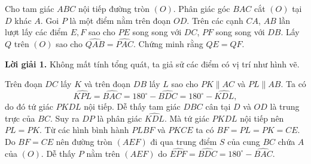 \begin{bt}%
	Cho tam giác $ABC$ nội tiếp đường tròn $(O)$. Phân giác góc $BAC$ cắt $(O)$ tại $D$ khác $A$. Goi $P$ là một điểm nằm trên đoạn $OD$. Trên các cạnh $CA$, $AB$ lần lượt lấy các điểm $E,F$ sao cho $PE$ song song với $DC$, $PF$ song song với $DB$. Lấy $Q$ trên $(O)$ sao cho $\widehat{QAB} = \widehat{PAC}$. Chứng minh rằng $QE = QF$.
	\loigiai
	{{\bf Lời giải 1.} Không mất tính tổng quát, ta giả sử các điểm có vị trí như hình vẽ.
		\begin{center}
		\end{center}
		Trên đoạn $DC$ lấy $K$ và trên đoạn $DB$ lấy $L$ sao cho $PK \parallel AC$ và $PL \parallel AB$. Ta có $$\widehat{KPL} = \widehat{BAC} = 180^ \circ - \widehat{BDC} = 180^\circ - \widehat{KDL},$$ do đó tứ giác $PKDL$ nội tiếp.
		Dễ thấy tam giác $DBC$ cân tại $D$ và $OD$ là trung trực của $BC$. Suy ra $DP$ là phân giác $\widehat{KDL}$. Mà tứ giác $PKDL$ nội tiếp nên $PL = PK$. Từ các hình bình hành $PLBF$ và $PKCE$ ta có $BF = PL = PK = CE$. Do $BF = CE$ nên đường tròn $(AEF)$ đi qua trung điểm $S$ của cung $BC$ chứa $A$ của $(O)$. Dễ thấy $P$ nằm trên $(AEF)$ do $\widehat{EPF} = \widehat{BDC} = 180^\circ -\widehat{BAC}$. 
}
\end{bt}
